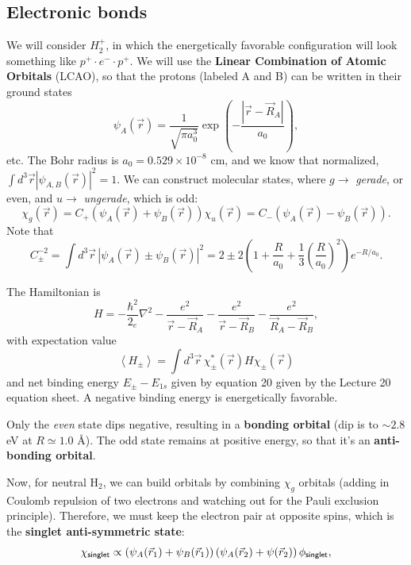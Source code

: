 \documentclass{tufte-handout}
\renewcommand{\textbf}[1]{{\bf \textcolor{dark-gray}{#1}}}
\renewcommand{\rm}{\sf}
\newcommand{\e}[1]{\times 10^{#1}}
\newcommand{\ev}[1]{\left\langle  {#1} \right \rangle} %
\begin{document}
\subsection{Electronic bonds}
We will consider $H_2^+$, in which the energetically favorable configuration will look something like $p^+ \cdot e^- \cdot p^+$. We will use the \textbf{Linear Combination of Atomic Orbitals} (LCAO), so that the protons (labeled A and B) can be written in their ground states
\begin{equation}
\psi_A(\vec r) = \frac{1}{\sqrt{\pi a_0^3}} \exp\left (- \frac{|\vec r - \vec R_A|}{a_0}\right ),
\end{equation}
etc. The Bohr radius is $a_0 = 0.529\e{-8}$ cm, and we know that normalized, $\int d^3 \vec r |\psi_{A,B}(\vec r)|^2 = 1$. We can construct molecular states, where $g \rightarrow$ \textit{gerade}, or even, and $u\rightarrow$ \textit{ungerade}, which is odd:
\begin{equation}
\chi_g(\vec r) = C_+ \left (\psi_A(\vec r) + \psi_B(\vec r)\right )
\chi_u(\vec r) = C_- \left (\psi_A(\vec r) - \psi_B(\vec r)\right ).
\end{equation}
Note that 
\begin{equation}
C_{\pm}^{-2} = \int d^3 \vec r \, \left |\psi_A(\vec r) \pm \psi_B (\vec r)\right |^2 = 2 \pm 2\left (1 + \frac{R}{a_0} + \frac{1}{3}\left (\frac{R}{a_0}\right )^2\right )e^{-R/a_0}.
\end{equation}

The Hamiltonian is
\begin{equation}
H = -\frac{\hbar^2}{2_e}\nabla^2 - \frac{e^2}{\vec r - \vec R_A}- \frac{e^2}{\vec r - \vec R_B}- \frac{e^2}{\vec R_A - \vec R_B},
\end{equation}
with expectation value
\begin{equation}
\ev{H_{\pm}} = \int d^3 \vec r\, \chi_{\pm}^*(\vec r) H \chi_{\pm}(\vec r)
\end{equation}
and net binding energy $E_{\pm} - E_{1s}$ given by equation 20 given by the Lecture 20 equation sheet. A negative binding energy is energetically favorable.

Only the \textit{even} state dips negative, resulting in a \textbf{bonding orbital} (dip is to $\sim 2.8$ eV at $R \simeq 1.0$ \AA{}). The odd state remains at positive energy, so that it's an \textbf{anti-bonding orbital}.

Now, for neutral H$_2$, we can build orbitals by combining $\chi_g$ orbitals (adding in Coulomb repulsion of two electrons and watching out for the Pauli exclusion principle). Therefore, we must keep the electron pair at opposite spins, which is the \textbf{singlet anti-symmetric state}:
\begin{equation}
\chi_{\rm singlet} \propto \left (\psi_A(\vec r_1) + \psi_B(\vec r_1)\right )\left (\psi_A(\vec r_2) + \psi (\vec r_2)\right )\phi_{\rm singlet},
\end{equation}
\end{document}

